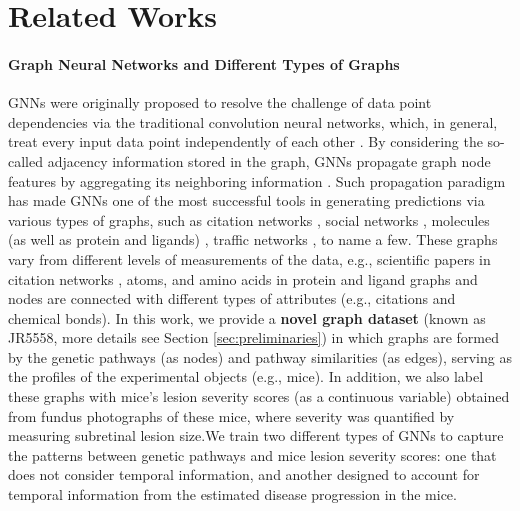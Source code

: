 \section{Related Works}
\label{append:related_works}

\paragraph{Graph Neural Networks and Different Types of Graphs}
GNNs were originally proposed to resolve the challenge of data point dependencies via the traditional convolution neural networks, which, in general, treat every input data point independently of each other \citep{kipf2016semi,defferrard2016convolutional}. By considering the so-called adjacency information stored in the graph, GNNs propagate graph node features by aggregating its neighboring information \citep{wu2020comprehensive}. Such propagation paradigm has made GNNs one of the most successful tools in generating predictions via various types of graphs, such as citation networks \citep{wu2020comprehensive}, social networks \citep{sharma2024survey}, molecules (as well as protein and ligands) \citep{zhang2022graph}, traffic networks \citep{jiang2022graph}, to name a few. These graphs vary from different levels of measurements of the data, e.g., scientific papers in citation networks \citep{yang2016revisiting}, atoms, and amino acids in protein and ligand graphs \citep{wu2018moleculenet,GilmerSchoenholzRiley2017} and nodes are connected with different types of attributes (e.g., citations and chemical bonds). In this work, we provide a \textbf{novel graph dataset} (known as JR5558, more details see Section \ref{sec:preliminaries}) in which graphs are formed by the genetic pathways (as nodes) and pathway similarities (as edges), serving as the profiles of the experimental objects (e.g., mice). In addition, we also label these graphs with mice's lesion severity scores (as a continuous variable) obtained from fundus photographs of these mice, where severity was quantified by measuring subretinal lesion size.We train two different types of GNNs to capture the patterns between genetic pathways and mice lesion severity scores: one that does not consider temporal information, and another designed to account for temporal information from the estimated disease progression in the mice.



